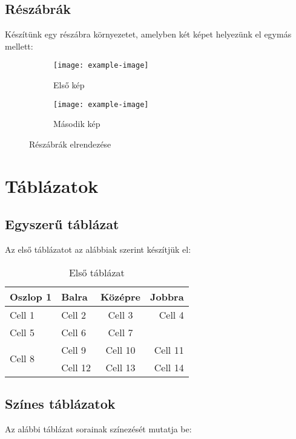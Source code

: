 \documentclass[12pt]{article}
\begin{document}
\subsection{Részábrák}
Készítünk egy részábra környezetet, amelyben két képet helyezünk el egymás mellett:

\begin{figure}[h]
    \centering
    \begin{subfigure}[b]{0.4\textwidth}
        \texttt{[image: example-image]}
        \caption{Első kép}
        \label{fig:sub1}
    \end{subfigure}
    \hspace{1cm}
    \begin{subfigure}[b]{0.4\textwidth}
        \texttt{[image: example-image]}
        \caption{Második kép}
        \label{fig:sub2}
    \end{subfigure}
    \caption{Részábrák elrendezése}
    \label{fig:main_figure}
\end{figure}

\section{Táblázatok}

\subsection{Egyszerű táblázat}
Az első táblázatot az alábbiak szerint készítjük el:

\begin{table}[h]
    \centering
    \begin{tabular}{|p{30pt}|l|c|r|}
        \hline
        \textbf{Oszlop 1} & \textbf{Balra} & \textbf{Középre} & \textbf{Jobbra} \\
        \hline
        Cell 1 & Cell 2 & Cell 3 & Cell 4 \\
        \hline
        Cell 5 & Cell 6 & Cell 7 & \\
        \hline
        \multirow{2}{*}{Cell 8} & Cell 9 & Cell 10 & Cell 11 \\
        \cline{2-4}
        & Cell 12 & Cell 13 & Cell 14 \\
        \hline
    \end{tabular}
    \caption{Első táblázat}
    \label{tab:table1}
\end{table}

\subsection{Színes táblázatok}
Az alábbi táblázat sorainak színezését mutatja be:
\end{document}
